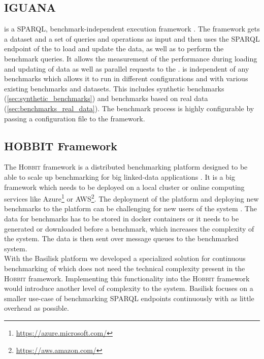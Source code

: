 \subsection{IGUANA}
\label{sec:iguana}
\iguana{} is a SPARQL, benchmark-independent execution framework \cite{conradsIguanaGenericFramework2017}.
The framework gets a dataset and a set of queries and operations as input and then uses the SPARQL endpoint of the \ts{} to load and update the data, as well as to perform the benchmark queries.
It allows the measurement of the performance during loading and updating of data as well as parallel requests to the \ts{}.
\iguana{} is independent of any benchmarks which allows it to run in different configurations and with various existing benchmarks and datasets.
This includes synthetic benchmarks (\ref{sec:synthetic_benchmarks}) and benchmarks based on real data (\ref{sec:benchmarks_real_data}).
The benchmark process is highly configurable by passing a configuration file to the \iguana{} framework.


\subsection{HOBBIT Framework}
The \textsc{Hobbit} framework is a distributed benchmarking platform designed to be able to scale up benchmarking for big linked-data applications \cite{roderHOBBITPlatformBenchmarking}.
It is a big framework which needs to be deployed on a local cluster or online computing services like Azure\footnote{\url{https://azure.microsoft.com/}} or AWS\footnote{\url{https://aws.amazon.com/}}.
The deployment of the platform and deploying new benchmarks to the platform can be challenging for new users of the system \cite{roderHOBBITPlatformBenchmarking}.
The data for benchmarks has to be stored in docker containers or it needs to be generated or downloaded before a benchmark, which increases the complexity of the system.
The data is then sent over message queues to the benchmarked system.
\\

With the Basilisk platform we developed a specialized solution for continuous benchmarking of \tsp{} which does not need the technical complexity present in the \textsc{Hobbit} framework.
Implementing this functionality into the \textsc{Hobbit} framework would introduce another level of complexity to the system.
Basilisk focuses on a smaller use-case of benchmarking SPARQL endpoints continuously with as little overhead as possible.

